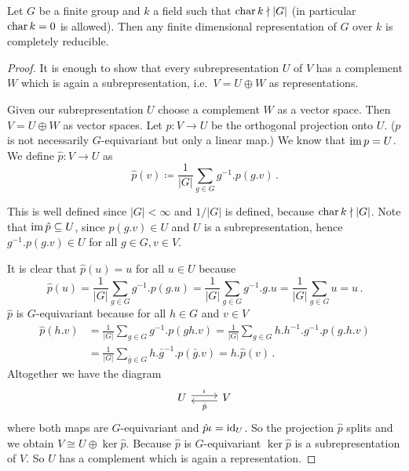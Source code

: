 \begin{theorem}
  Let $G$ be a finite group and $k$ a field such that $\operatorname{char} k \nmid |G|$ (in particular $\operatorname{char} k = 0$ is allowed). Then any finite dimensional representation of $G$ over $k$ is completely reducible.
\end{theorem}
\begin{proof}
  It is enough to show that every subrepresentation $U$ of $V$ has a complement $W$ which is again a subrepresentation, i.e.\ $V = U \oplus W$ as representations.
  
  Given our subrepresentation $U$ choose a complement $W$ as a vector space.
  Then $V = U \oplus W$ as vector spaces. Let $p \colon V \to U$ be the orthogonal projection onto $U$.
  ($p$ is not necessarily $G$-equivariant but only a linear map.)
  We know that $\operatorname{im} p = U$.
  We define $\hat{p} \colon V \to U$ as
  \[
              \hat{p}(v)
    \coloneqq \frac{1}{|G|} \sum_{g \in G} g^{-1}.p(g.v) \,.
  \]

  This is well defined since $|G| < \infty$ and $1/|G|$ is defined, because $\operatorname{char} k \nmid |G|$.
  Note that $\operatorname{im} \hat{p} \subseteq U$, since $p(g.v) \in U$ and $U$ is a subrepresentation, hence $g^{-1}.p(g.v) \in U$ for all $g \in G, v \in V$.

  It is clear that $\hat{p}(u) = u$ for all $u \in U$ because
  \[
      \hat{p}(u)
    = \frac{1}{|G|} \sum_{g \in G} g^{-1}.p(g.u)
    = \frac{1}{|G|} \sum_{g \in G} g^{-1}.g.u
    = \frac{1}{|G|} \sum_{g \in G} u
    = u \,.
  \]
  $\hat{p}$ is $G$-equivariant because for all $h \in G$ and $v \in V$
  \begin{align*}
        \hat{p}(h.v)
    &=  \frac{1}{|G|} \sum_{g \in G} g^{-1}.p(gh.v)
     =  \frac{1}{|G|} \sum_{g \in G} h.h^{-1}.g^{-1}.p(g.h.v) \\
    &=  \frac{1}{|G|} \sum_{\bar{g} \in G} h.\bar{g}^{-1}.p(\bar{g}.v)
     =  h.\hat{p}(v) \,.
  \end{align*}
  Altogether we have the diagram
  \[
    \begin{tikzcd}
        U
        \arrow[shift left]{r}{\iota}
      & V
        \arrow[shift left]{l}{\hat{p}}
    \end{tikzcd}
  \]
  where both maps are $G$-equivariant and $\hat{p} \iota = \operatorname{id}_U$.
  So the projection $\hat{p}$ splits and we obtain $V \cong U \oplus \ker \hat{p}$.
  Because $\hat{p}$ is $G$-equivariant $\ker \hat{p}$ is a subrepresentation of $V$.
  So $U$ has a complement which is again a representation.
\end{proof}

